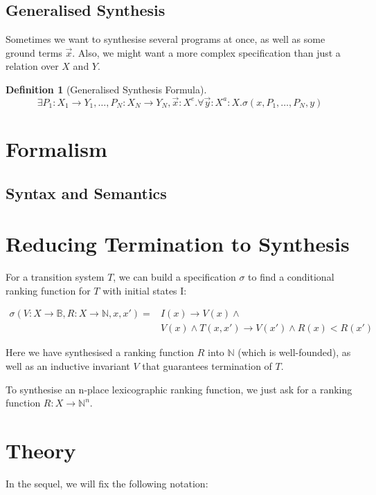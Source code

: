 \documentclass[preprint]{sigplanconf}
\theoremstyle{definition}
\newtheorem{definition}[theorem]{Definition}
\begin{document}
\subsection{Generalised Synthesis}
Sometimes we want to synthesise several programs at once, as well as some
ground terms $\vec{x}$.  Also, we might want a more complex specification
than just a relation over $X$ and $Y$.

\begin{definition}[Generalised Synthesis Formula]
 $$\exists P_1: X_1 \to Y_1, \ldots, P_N: X_N \to Y_N , \vec{x}: X^e . \forall \vec{y}: X^a: X . \sigma(x, P_1, \ldots, P_N, y) $$
\end{definition}


\section{Formalism}
\subsection{Syntax and Semantics}

\section{Reducing Termination to Synthesis}
For a transition system $T$, we can build a specification $\sigma$ to find a conditional ranking function for
$T$ with initial states I:

\begin{eqnarray}
 \sigma(V: X \to \mathbb{B}, R: X \to \mathbb{N}, x, x') = & I(x) \rightarrow V(x) \wedge \\
 & V(x) \wedge T(x, x') \rightarrow V(x') \wedge R(x) < R(x') 
\end{eqnarray}

Here we have synthesised a ranking function $R$ into $\mathbb{N}$ (which is well-founded),
as well as an inductive invariant $V$ that guarantees termination of $T$.

To synthesise an n-place lexicographic ranking function, we just ask for a ranking function
$R: X \to \mathbb{N}^n$.

\section{Theory}

In the sequel, we will fix the following notation:
\end{document}
